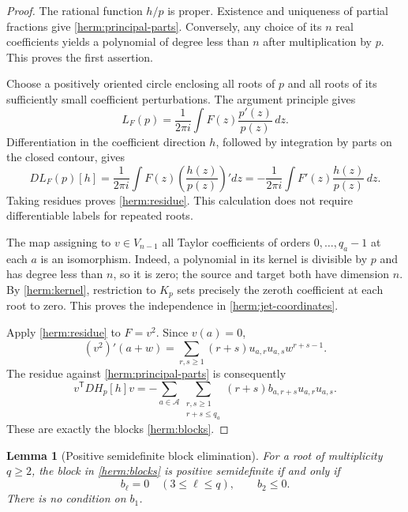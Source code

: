 \documentclass[reqno]{amsart}
\newtheorem{lemma}[theorem]{Lemma}
\theoremstyle{definition}
\theoremstyle{remark}
\begin{document}
\begin{proof}
The rational function $h/p$ is proper.  Existence and uniqueness of
partial fractions give \eqref{herm:principal-parts}.  Conversely, any
choice of its $n$ real coefficients yields a polynomial of degree less
than $n$ after multiplication by $p$.  This proves the first assertion.

Choose a positively oriented circle enclosing all roots of $p$ and all
roots of its sufficiently small coefficient perturbations.  The argument
principle gives
\[
 L_F(p)=\frac{1}{2\pi i}\int F(z)\frac{p'(z)}{p(z)}\,dz.
\]
Differentiation in the coefficient direction $h$, followed by integration
by parts on the closed contour, gives
\[
 DL_F(p)[h]
 =\frac{1}{2\pi i}\int F(z)
                   \left(\frac{h(z)}{p(z)}\right)'dz
 =-\frac{1}{2\pi i}\int F'(z)\frac{h(z)}{p(z)}\,dz.
\]
Taking residues proves \eqref{herm:residue}.  This calculation does not
require differentiable labels for repeated roots.

The map assigning to $v\in V_{n-1}$ all Taylor coefficients of orders
$0,\ldots,q_a-1$ at each $a$ is an isomorphism.  Indeed, a polynomial in
its kernel is divisible by $p$ and has degree less than $n$, so it is
zero; the source and target both have dimension $n$.  By
\eqref{herm:kernel}, restriction to $K_p$ sets precisely the zeroth
coefficient at each root to zero.  This proves the independence in
\eqref{herm:jet-coordinates}.

Apply \eqref{herm:residue} to $F=v^2$.  Since $v(a)=0$,
\[
 (v^2)'(a+w)=
       \sum_{r,s\geq1}(r+s)u_{a,r}u_{a,s}w^{r+s-1}.
\]
The residue against \eqref{herm:principal-parts} is consequently
\[
 v^{\mathsf T}DH_p[h]v
 =-\sum_{a\in\mathcal A}
       \sum_{\substack{r,s\geq1\\r+s\leq q_a}}
         (r+s)b_{a,r+s}u_{a,r}u_{a,s}.
\]
These are exactly the blocks \eqref{herm:blocks}.
\end{proof}

\begin{lemma}[Positive semidefinite block elimination]
\label{herm:block-elimination}
For a root of multiplicity $q\geq2$, the block in
\eqref{herm:blocks} is positive semidefinite if and only if
\begin{equation}
 b_\ell=0\quad(3\leq\ell\leq q),
 \qquad b_2\leq0.
 \label{herm:block-condition}
\end{equation}
There is no condition on $b_1$.
\end{lemma}
\end{document}
